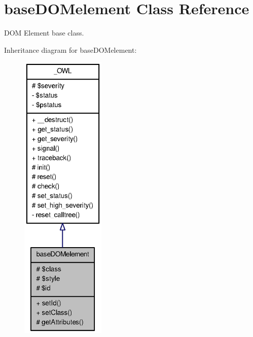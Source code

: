 \section{baseDOMelement Class Reference}
\label{classbaseDOMelement}


DOM Element base class.  




Inheritance diagram for baseDOMelement:\nopagebreak
\begin{figure}[H]
\begin{center}
\leavevmode
\includegraphics[height=400pt]{classbaseDOMelement__inherit__graph}
\end{center}
\end{figure}


